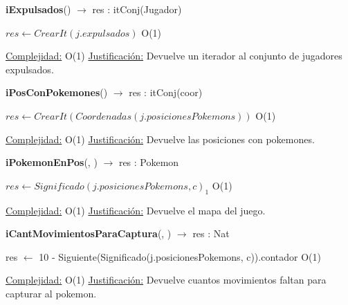 \begin{algorithm}[H]{\textbf{iExpulsados}() $\to$ res : itConj(Jugador)} 
	{}
	\begin{algorithmic}
		\State $res \gets CrearIt(j.expulsados) $ \Comment O(1)
	
		\medskip
		\Statex \underline{Complejidad:} O(1)
		\Statex \underline{Justificación:} Devuelve un iterador al conjunto de jugadores expulsados.
    \end{algorithmic}
\end{algorithm}

\begin{algorithm}[H]{\textbf{iPosConPokemones}() $\to$ res : itConj(coor)} 
	{}
	\begin{algorithmic}
		\State $res \gets CrearIt(Coordenadas(j.posicionesPokemons)) $ \Comment O(1)
	
		\medskip
		\Statex \underline{Complejidad:} O(1)
		\Statex \underline{Justificación:} Devuelve las posiciones con pokemones.
    \end{algorithmic}
\end{algorithm}

\begin{algorithm}[H]{\textbf{iPokemonEnPos}(, ) $\to$ res : Pokemon} 
	{}
	\begin{algorithmic}
		\State $res \gets Significado(j.posicionesPokemons, c)_{1} $ \Comment O(1)
	
		\medskip
		\Statex \underline{Complejidad:} O(1)
		\Statex \underline{Justificación:} Devuelve el mapa del juego.
    \end{algorithmic}
\end{algorithm}

\begin{algorithm}[H]{\textbf{iCantMovimientosParaCaptura}(, ) $\to$ res : Nat} 
	{}
	\begin{algorithmic}
		\State res $\gets$ 10 - Siguiente(Significado(j.posicionesPokemons, c)).contador  \Comment O(1)
	
		\medskip
		\Statex \underline{Complejidad:} O(1)
		\Statex \underline{Justificación:} Devuelve cuantos movimientos faltan para capturar al pokemon.
    \end{algorithmic}
\end{algorithm}

